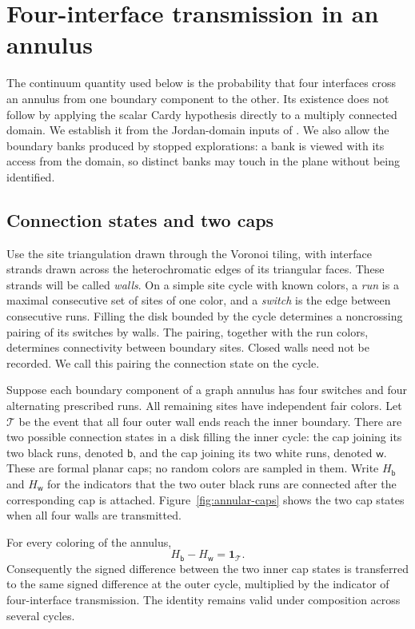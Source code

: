 \section{Four-interface transmission in an annulus}
\label{sec:annuli}

The continuum quantity used below is the probability that four interfaces
cross an annulus from one boundary component to the other.  Its existence
does not follow by applying the scalar Cardy hypothesis directly to a
multiply connected domain.  We establish it from the Jordan-domain inputs
of \cite{V}.  We also allow the boundary banks produced by stopped
explorations: a bank is viewed with its access from the domain, so distinct
banks may touch in the plane without being identified.

\subsection{Connection states and two caps}

Use the site triangulation drawn through the Voronoi tiling, with interface
strands drawn across the heterochromatic edges of its triangular faces.
These strands will be called \emph{walls}.  On a simple site cycle with
known colors, a \emph{run} is a maximal consecutive set of sites of one
color, and a \emph{switch} is the edge between consecutive runs.  Filling
the disk bounded by the cycle determines a noncrossing pairing of its switches by
walls.  The pairing, together with the run colors, determines connectivity
between boundary sites.  Closed walls need not be recorded.  We call this
pairing the connection state on the cycle.

Suppose each boundary component of a graph annulus has four switches and
four alternating prescribed runs.  All remaining sites have independent
fair colors.  Let $\mathcal T$ be the event that all four outer wall ends
reach the inner boundary.  There are two possible connection states in a
disk filling the inner cycle: the cap joining its two black runs, denoted
$\mathsf b$, and the cap joining its two white runs, denoted $\mathsf w$.
These are formal planar caps; no random colors are sampled in them.  Write
$H_{\mathsf b}$ and $H_{\mathsf w}$ for the indicators that the two outer
black runs are connected after the corresponding cap is attached.
Figure~\ref{fig:annular-caps} shows the two cap states when all four
walls are transmitted.

\begin{lemma}\label{an:caps}
For every coloring of the annulus,
\begin{equation}\label{an:cap-equation}
 H_{\mathsf b}-H_{\mathsf w}=\mathbf 1_{\mathcal T}.
\end{equation}
Consequently the signed difference between the two inner cap states is
transferred to the same signed difference at the outer cycle, multiplied
by the indicator of four-interface transmission.  The identity remains
valid under composition across several cycles.
\end{lemma}

